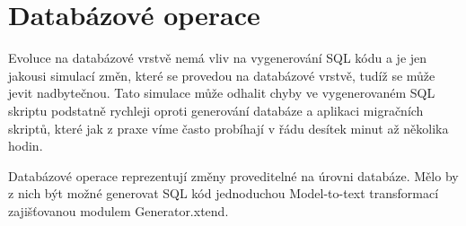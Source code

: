 \documentclass[11pt,twoside,a4paper]{book}
\begin{document}
\FloatBarrier

\section{Databázové operace} \label{db_ops}

Evoluce na databázové vrstvě nemá vliv na vygenerování SQL kódu a je jen
jakousi simulací změn, které se provedou na databázové vrstvě, tudíž se může
jevit nadbytečnou. Tato simulace může odhalit chyby ve vygenerovaném
SQL skriptu podstatně rychleji oproti generování databáze a aplikaci migračních
skriptů, které jak z praxe víme často probíhají v řádu desítek minut až
několika hodin.

Databázové operace reprezentují změny proveditelné na úrovni databáze. Mělo by z
nich být možné generovat SQL kód jednoduchou Model-to-text transformací
zajišťovanou modulem Generator.xtend.
\end{document}
